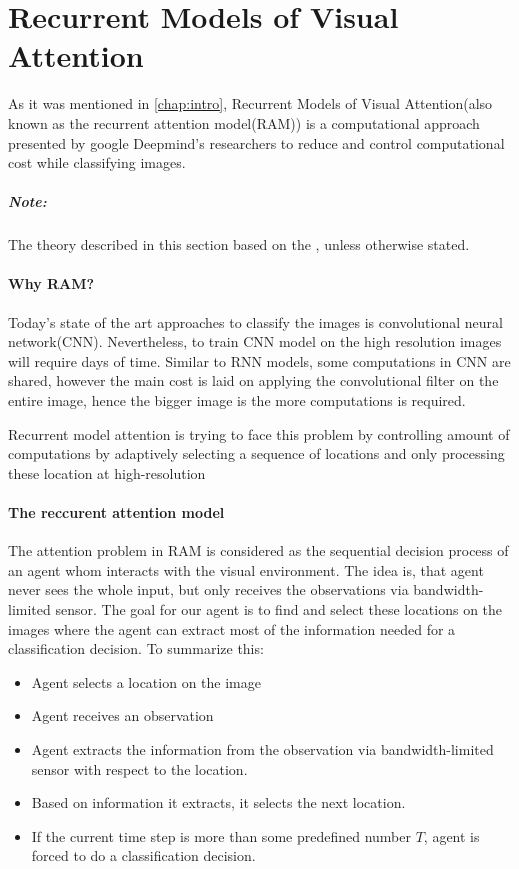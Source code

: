 \section{Recurrent Models of Visual Attention}
\label{sec:ram_model}
As it was mentioned in \autoref{chap:intro}, Recurrent Models of Visual
Attention(also known as the recurrent attention model(RAM)) is
a computational approach presented by google Deepmind’s researchers to reduce
and control computational cost while classifying images.
\subparagraph{Note: } The theory described in this section based on the
\cite{DBLP:journals/corr/MnihHGK14}, unless otherwise stated.

\paragraph{Why RAM?}
Today's state of the art approaches to classify the images is convolutional
neural network(CNN). Nevertheless, to train CNN model on the high resolution
images will require days of time. Similar to RNN models, some computations
in CNN are shared, however the main cost is laid on applying the convolutional
filter on the entire image, hence the bigger image is the
more computations is required.\cite{Krizhevsky2012}

Recurrent model attention is trying to face this problem by
controlling amount of computations by adaptively selecting a sequence of
locations and only processing these location at high-resolution


\paragraph{The reccurent attention model}
The attention problem in RAM is considered as the sequential decision
process of an agent whom interacts with the visual environment. The idea is,
that agent never sees the whole input, but only receives the observations
via bandwidth-limited sensor. The goal for our agent is
to find and select these locations on the images where the agent can extract
most of the information needed for a classification decision.
To summarize this:
\begin{itemize}
	\item Agent selects a location on the image
	\item Agent receives an observation
	\item Agent extracts the information from the observation via bandwidth-limited
		sensor with respect to the location.
	\item Based on information it extracts, it selects the next location.
	\item If the current time step is
		more than some predefined number $T$, agent is forced to do a
		classification decision.
\end{itemize}

